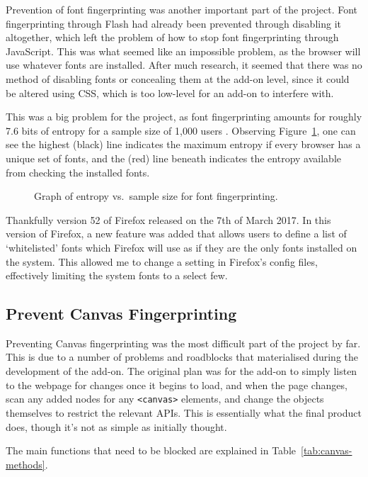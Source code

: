 Prevention of font fingerprinting was another important part of the project.
Font fingerprinting through Flash had already been prevented through disabling it altogether, which left the problem of how to stop font fingerprinting through JavaScript.
This was what seemed like an impossible problem, as the browser will use whatever fonts are installed.
After much research, it seemed that there was no method of disabling fonts or concealing them at the add-on level, since it could be altered using CSS, which is too low-level for an add-on to interfere with.

This was a big problem for the project, as font fingerprinting amounts for roughly 7.6 bits of entropy for a sample size of 1,000 users \citep{font-metrics}.
Observing Figure~\ref{fig:font-metrics}, one can see the highest (black) line indicates the maximum entropy if every browser has a unique set of fonts, and the (red) line beneath indicates the entropy available from checking the installed fonts.

\begin{figure}[h!]
\centering
\caption{Graph of entropy vs.\ sample size for font fingerprinting.}
\label{fig:font-metrics}
\end{figure}

Thankfully version 52 of Firefox released on the 7th of March 2017.
In this version of Firefox, a new feature was added that allows users to define a list of `whitelisted' fonts which Firefox will use as if they are the only fonts installed on the system.
This allowed me to change a setting in Firefox's config files, effectively limiting the system fonts to a select few.

\subsection{Prevent Canvas Fingerprinting}

Preventing Canvas fingerprinting was the most difficult part of the project by far.
This is due to a number of problems and roadblocks that materialised during the development of the add-on.
The original plan was for the add-on to simply listen to the webpage for changes once it begins to load, and when the page changes, scan any added nodes for any \texttt{<canvas>} elements, and change the objects themselves to restrict the relevant APIs.
This is essentially what the final product does, though it's not as simple as initially thought.

The main functions that need to be blocked are explained in Table~\ref{tab:canvas-methods}.

